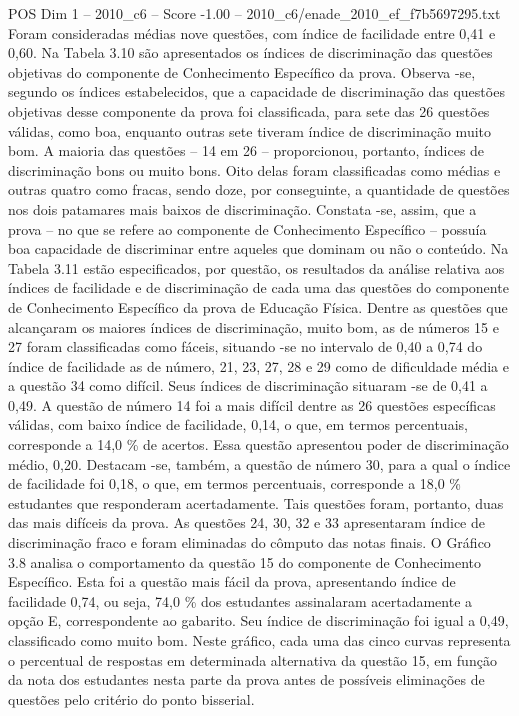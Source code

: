 \begin{textsample}{POS Dim 1 – 2010\_c6 – Score -1.00 – 2010\_c6/enade\_2010\_ef\_f7b5697295.txt}
Foram consideradas médias nove questões, com índice de facilidade entre 0,41 e 0,60.
Na Tabela 3.10 são apresentados os índices de discriminação das questões objetivas do componente de Conhecimento Específico da prova.
Observa -se, segundo os índices estabelecidos, que a capacidade de discriminação das questões objetivas desse componente da prova foi classificada, para sete das 26 questões válidas, como boa, enquanto outras sete tiveram índice de discriminação muito bom.
A maioria das questões – 14 em 26 – proporcionou, portanto, índices de discriminação bons ou muito bons.
Oito delas foram classificadas como médias e outras quatro como fracas, sendo doze, por conseguinte, a quantidade de questões nos dois patamares mais baixos de discriminação.
Constata -se, assim, que a prova – no que se refere ao componente de Conhecimento Específico – possuía boa capacidade de discriminar entre aqueles que dominam ou não o conteúdo.
Na Tabela 3.11 estão especificados, por questão, os resultados da análise relativa aos índices de facilidade e de discriminação de cada uma das questões do componente de Conhecimento Específico da prova de Educação Física.
Dentre as questões que alcançaram os maiores índices de discriminação, muito bom, as de números 15 e 27 foram classificadas como fáceis, situando -se no intervalo de 0,40 a 0,74 do índice de facilidade as de número, 21, 23, 27, 28 e 29 como de dificuldade média e a questão 34 como difícil.
Seus índices de discriminação situaram -se de 0,41 a 0,49.
A questão de número 14 foi a mais difícil dentre as 26 questões específicas válidas, com baixo índice de facilidade, 0,14, o que, em termos percentuais, corresponde a 14,0 \% de acertos.
Essa questão apresentou poder de discriminação médio, 0,20.
Destacam -se, também, a questão de número 30, para a qual o índice de facilidade foi 0,18, o que, em termos percentuais, corresponde a 18,0 \% estudantes que responderam acertadamente.
Tais questões foram, portanto, duas das mais difíceis da prova.
As questões 24, 30, 32 e 33 apresentaram índice de discriminação fraco e foram eliminadas do cômputo das notas finais.
O Gráfico 3.8 analisa o comportamento da questão 15 do componente de Conhecimento Específico.
Esta foi a questão mais fácil da prova, apresentando índice de facilidade 0,74, ou seja, 74,0 \% dos estudantes assinalaram acertadamente a opção E, correspondente ao gabarito.
Seu índice de discriminação foi igual a 0,49, classificado como muito bom.
Neste gráfico, cada uma das cinco curvas representa o percentual de respostas em determinada alternativa da questão 15, em função da nota dos estudantes nesta parte da prova antes de possíveis eliminações de questões pelo critério do ponto bisserial.

\end{textsample}

